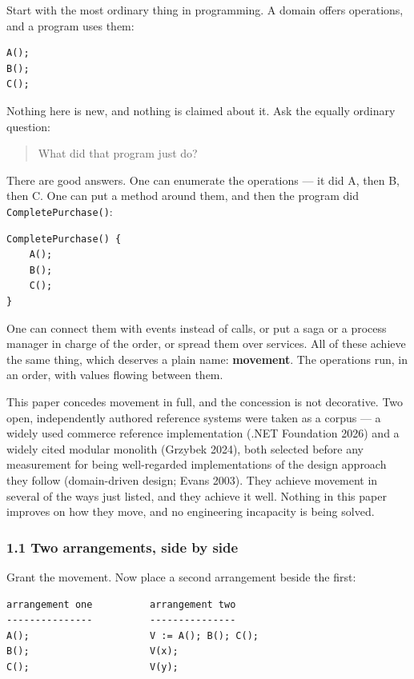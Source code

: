 \documentclass[
]{article}
\begin{document}
Start with the most ordinary thing in programming. A domain offers
operations, and a program uses them:

\begin{verbatim}
A();
B();
C();
\end{verbatim}

Nothing here is new, and nothing is claimed about it. Ask the equally
ordinary question:

\begin{quote}
What did that program just do?
\end{quote}

There are good answers. One can enumerate the operations --- it did A,
then B, then C. One can put a method around them, and then the program
did \texttt{CompletePurchase()}:

\begin{verbatim}
CompletePurchase() {
    A();
    B();
    C();
}
\end{verbatim}

One can connect them with events instead of calls, or put a saga or a
process manager in charge of the order, or spread them over services.
All of these achieve the same thing, which deserves a plain name:
\textbf{movement}. The operations run, in an order, with values flowing
between them.

This paper concedes movement in full, and the concession is not
decorative. Two open, independently authored reference systems were
taken as a corpus --- a widely used commerce reference implementation
(.NET Foundation 2026) and a widely cited modular monolith (Grzybek
2024), both selected before any measurement for being well-regarded
implementations of the design approach they follow (domain-driven
design; Evans 2003). They achieve movement in several of the ways just
listed, and they achieve it well. Nothing in this paper improves on how
they move, and no engineering incapacity is being solved.

\subsubsection{1.1 Two arrangements, side by
side}\label{two-arrangements-side-by-side}

Grant the movement. Now place a second arrangement beside the first:

\begin{verbatim}
arrangement one          arrangement two
---------------          ---------------
A();                     V := A(); B(); C();
B();                     V(x);
C();                     V(y);
\end{verbatim}
\end{document}
